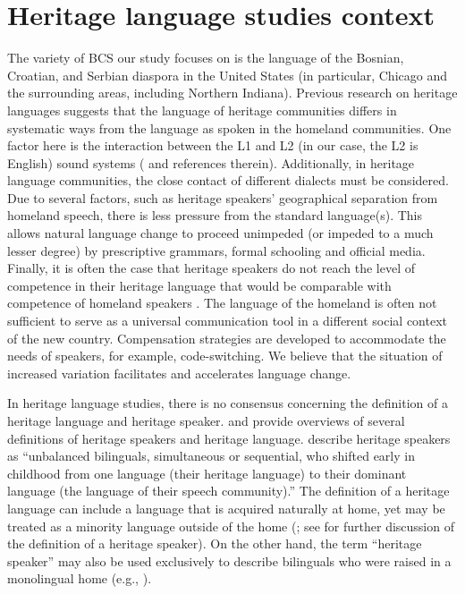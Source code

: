 \documentclass[output=paper,
modfonts,
newtxmath,
hidelinks,
]{langscibook}
\begin{document}
\section{Heritage language studies context}\label{sec:mihajlovic:2}

The variety of BCS our study focuses on is the language of the Bosnian, Croatian, and Serbian diaspora in the United States (in particular, Chicago and the surrounding areas, including Northern Indiana). Previous research on heritage languages suggests that the language of heritage communities differs in systematic ways from the language as spoken in the homeland communities. One factor here is the interaction between the L1 and L2 (in our case, the L2 is English) sound systems (\citealt{Polinsky2018} and references therein). Additionally, in heritage language communities, the close contact of different dialects must be considered. Due to several factors, such as heritage speakers’ geographical separation from homeland speech, there is less pressure from the standard language(s). This allows natural language change to proceed unimpeded (or impeded to a much lesser degree) by prescriptive grammars, formal schooling and official media. Finally, it is often the case that heritage speakers do not reach the level of competence in their heritage language that would be comparable with competence of homeland speakers \citep{Scontras-etal2015}. The language of the homeland is often not sufficient to serve as a universal communication tool in a different social context of the new country. Compensation strategies are developed to accommodate the needs of speakers, for example, code-switching. We believe that the situation of increased variation facilitates and accelerates language change.



In heritage language studies, there is no consensus concerning the definition of a heritage language and heritage speaker. \citet{Polinsky2018} and \citet{Kelleher2010} provide overviews of several definitions of heritage speakers and heritage language. \citet[1]{Scontras-etal2015} describe heritage speakers as “unbalanced bilinguals, simultaneous or sequential, who shifted early in childhood from one language (their heritage language) to their dominant language (the language of their speech community).” The definition of a heritage language can include a language that is acquired naturally at home, yet may be treated as a minority language outside of the home (\citealt{Polinsky2018}; see \citealt{Kupisch-etal2014} for further discussion of the definition of a heritage speaker). On the other hand, the term “heritage speaker” may also be used exclusively to describe bilinguals who were raised in a monolingual home (e.g., \citealt{Polinsky-Kagan2007}).
\end{document}
